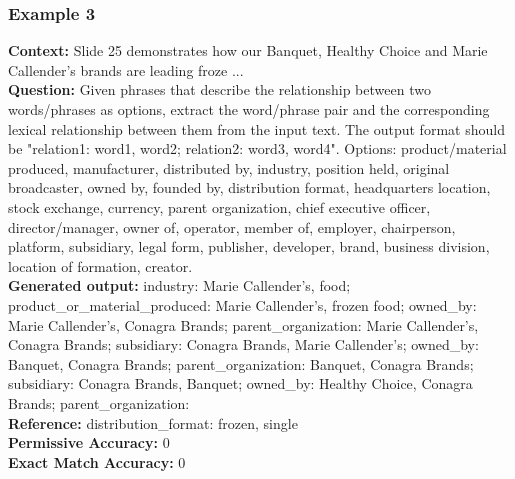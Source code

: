 \documentclass[logo,msc]{infthesis}           %
\begin{document}
\subsubsection{Example 3}
\textbf{Context:} Slide 25 demonstrates how our Banquet, Healthy Choice and Marie Callender's brands are leading froze ...
\\
\textbf{Question:} Given phrases that describe the relationship between two words/phrases as options, extract the word/phrase pair and the corresponding lexical relationship between them from the input text. The output format should be "relation1: word1, word2; relation2: word3, word4". Options: product/material produced, manufacturer, distributed by, industry, position held, original broadcaster, owned by, founded by, distribution format, headquarters location, stock exchange, currency, parent organization, chief executive officer, director/manager, owner of, operator, member of, employer, chairperson, platform, subsidiary, legal form, publisher, developer, brand, business division, location of formation, creator.
\\
\textbf{Generated output:} industry: Marie Callender's, food; product\_or\_material\_produced: Marie Callender's, frozen food; owned\_by: Marie Callender's, Conagra Brands; parent\_organization: Marie Callender's, Conagra Brands; subsidiary: Conagra Brands, Marie Callender's; owned\_by: Banquet, Conagra Brands; parent\_organization: Banquet, Conagra Brands; subsidiary: Conagra Brands, Banquet; owned\_by: Healthy Choice, Conagra Brands; parent\_organization:
\\
\textbf{Reference:} distribution\_format: frozen, single
\\
\textbf{Permissive Accuracy:} 0
\\
\textbf{Exact Match Accuracy:} 0

\lstset{
  breaklines=true,
  basicstyle=\ttfamily\small,
  columns=flexible,
  keepspaces=true
}
\end{document}
